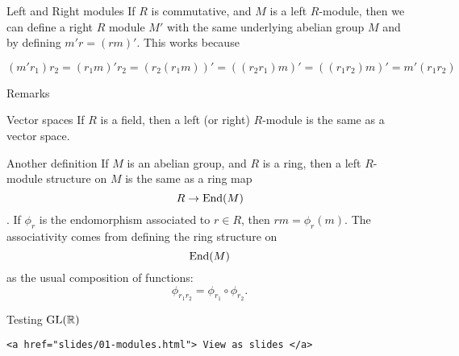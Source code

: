 \documentclass[
  ignorenonframetext,
]{beamer}
\begin{document}
\begin{frame}{Left and Right modules}
\protect\hypertarget{left-and-right-modules}{}
If \(R\) is commutative, and \(M\) is a left \(R\)-module, then we can
define a right \(R\) module \(M'\) with the same underlying abelian
group \(M\) and by defining \(m' r=(r m)'\). This works because

\[
(m'r_1) r_2 = (r_1 m)'r_2 = (r_2(r_1 m))'=((r_2 r_1)m)' =((r_1 r_2)m)' = m'(r_1 r_2)
\]
\end{frame}

\begin{frame}[fragile]{Remarks}
\protect\hypertarget{remarks}{}
\begin{block}{Vector spaces}
\protect\hypertarget{vector-spaces}{}
If \(R\) is a field, then a left (or right) \(R\)-module is the same as
a vector space.
\end{block}

\begin{block}{Another definition}
\protect\hypertarget{another-definition}{}
If \(M\) is an abelian group, and \(R\) is a ring, then a left
\(R\)-module structure on \(M\) is the same as a ring map
\[R\to \mathrm{End} (M)\]. If \(\phi_r\) is the endomorphism associated to
\(r\in R\), then \(rm=\phi_{r}(m)\). The associativity comes from
defining the ring structure on \[\mathrm{End} (M)\] as the usual composition of
functions: \[
\phi_{r_1 r_2}=\phi_{r_1}\circ\phi_{r_2}.
\]

Testing \(\mathrm{GL}(\mathbb{R})\)

\begin{verbatim}
<a href="slides/01-modules.html"> View as slides </a>
\end{verbatim}
\end{block}
\end{frame}
\end{document}
